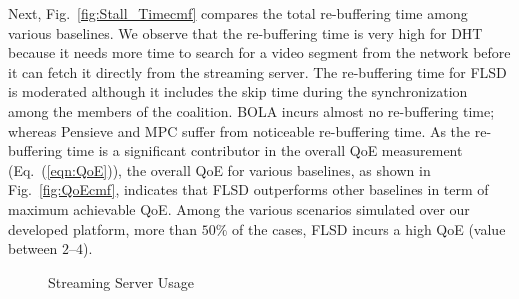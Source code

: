 Next, Fig.~\ref{fig:Stall_Timecmf} compares the total re-buffering time among various baselines. We observe that the re-buffering time is very high for DHT because it needs more time to search for a video segment from the network before it can fetch it directly from the streaming server. The re-buffering time for FLSD is moderated although it includes the skip time during the synchronization among the members of the coalition. BOLA incurs almost no re-buffering time; whereas Pensieve and MPC suffer from noticeable re-buffering time. As the re-buffering time is a significant contributor in the overall QoE measurement (Eq.~(\ref{eqn:QoE})), the overall QoE for various baselines, as shown in Fig.~\ref{fig:QoEcmf}, indicates that FLSD outperforms other baselines in term of maximum achievable QoE.  Among the various scenarios simulated over our developed platform, more than $50\%$ of the cases, FLSD incurs a high QoE (value between $2$--$4$). 
\begin{figure}[!ht]
	\captionsetup[subfigure]{}
	\begin{center}
	\end{center}
	\caption{\label{fig:cdnuploaded}Streaming Server Usage}
\end{figure}
